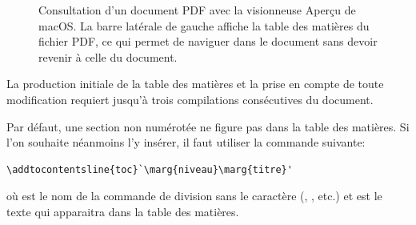 \begin{figure}
  \caption{Consultation d'un document PDF avec la visionneuse Aperçu
    de macOS. La barre latérale de gauche affiche la table des
    matières du fichier PDF, ce qui permet de naviguer dans le
    document sans devoir revenir à celle du document.}
  \label{fig:organisation:tdm-dans-pdf}
\end{figure}

\begin{important}
  La production initiale de la table des matières et la prise en
  compte de toute modification requiert jusqu'à trois compilations
  consécutives du document.
\end{important}

Par défaut, une section non numérotée ne figure pas dans la table des
matières. Si l'on souhaite néanmoins l'y insérer, il faut utiliser la
commande suivante:
\begin{lstlisting}
\addtocontentsline{toc}`\marg{niveau}\marg{titre}'
\end{lstlisting}
où  est le nom de la commande de division sans le
caractère {\bs} (, , etc.) et 
est le texte qui apparaitra dans la table des matières.

